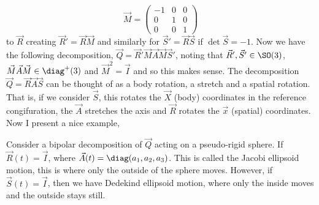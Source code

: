 $$ \vec M = \begin{pmatrix}
  -1 & 0 & 0 \\ 0 & 1 & 0 \\ 0 & 0 & 1
\end{pmatrix} $$
to $\vec R$ creating $\vec R' = \vec R\vec M$ and similarly for $\vec S' = \vec R\vec S$ if $\det \vec S = -1$. Now we have the following decomposition, $\vec Q = \vec R'\vec M\vec A\vec M\vec S'$, noting that $\vec R', \vec S' \in \SO(3)$, $\vec M\vec A\vec M \in \diag^+(3)$ and
 $\vec M^2 = \vec I$ and so this makes sense. The decomposition $\vec Q = \vec R\vec A\vec S$ can be thought of as a body rotation, a stretch and a spatial rotation. That is, if we consider $\vec S$, this rotates the $\vec X$ (body) coordinates in the reference congifuration, the $\vec A$ stretches the axis and $\vec R$ rotates the $\vec x$ (spatial) coordinates. Now I present a nice example,

\begin{eg}
  Consider a bipolar decomposition of $\vec Q$ acting on a pseudo-rigid sphere. If $\vec R(t) = \vec I$, where $\vec A(t) = \diag (a_1, a_2, a_3)$. This is called the Jacobi ellipsoid motion, this is where only the outside of the sphere moves. However, if $\vec S(t) = \vec I$, then we have Dedekind ellipsoid motion, where only the inside moves and the outside stays still.

  \begin{figure}[!ht]
    \begin{minipage}{0.49\textwidth}
      \centering
      \resizebox{0.48\textwidth}{!}{}
    \end{minipage}\hspace{20pt}\begin{minipage}{0.49\textwidth}
    \centering
    \resizebox{0.48\textwidth}{!}{}
    \end{minipage}
  \end{figure}
\end{eg}

